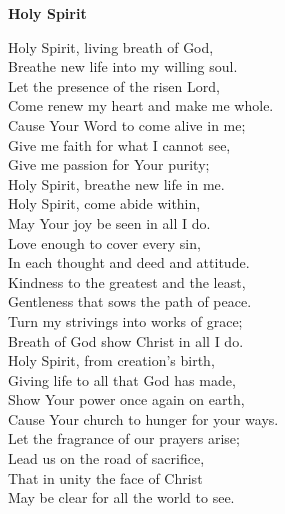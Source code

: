 \textbf{Holy Spirit}

Holy Spirit, living breath of God, \\
Breathe new life into my willing soul. \\
Let the presence of the risen Lord, \\
Come renew my heart and make me whole. \\
Cause Your Word to come alive in me; \\
Give me faith for what I cannot see, \\
Give me passion for Your purity; \\
Holy Spirit, breathe new life in me. \\

Holy Spirit, come abide within, \\
May Your joy be seen in all I do. \\
Love enough to cover every sin, \\
In each thought and deed and attitude. \\
Kindness to the greatest and the least, \\
Gentleness that sows the path of peace. \\
Turn my strivings into works of grace; \\
Breath of God show Christ in all I do. \\

Holy Spirit, from creation's birth, \\
Giving life to all that God has made, \\
Show Your power once again on earth, \\
Cause Your church to hunger for your ways. \\
Let the fragrance of our prayers arise; \\
Lead us on the road of sacrifice, \\
That in unity the face of Christ \\
May be clear for all the world to see. \\

